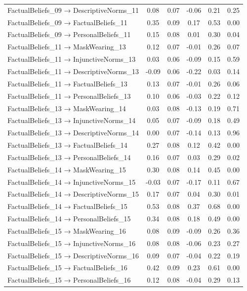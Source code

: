 \documentclass[
  man, donotrepeattitle,floatsintext]{apa6}
\begin{document}
\begin{center}
\begin{ThreePartTable}
{\begin{longtable}{lccccc}
FactualBeliefs\_09 → DescriptiveNorms\_11 & 0.08 & 0.07 & -0.06 & 0.21 & 0.25\\
FactualBeliefs\_09 → FactualBeliefs\_11 & 0.35 & 0.09 & 0.17 & 0.53 & 0.00\\
FactualBeliefs\_09 → PersonalBeliefs\_11 & 0.15 & 0.08 & 0.01 & 0.30 & 0.04\\
FactualBeliefs\_11 → MaskWearing\_13 & 0.12 & 0.07 & -0.01 & 0.26 & 0.07\\
FactualBeliefs\_11 → InjunctiveNorms\_13 & 0.03 & 0.06 & -0.09 & 0.15 & 0.59\\
FactualBeliefs\_11 → DescriptiveNorms\_13 & -0.09 & 0.06 & -0.22 & 0.03 & 0.14\\
FactualBeliefs\_11 → FactualBeliefs\_13 & 0.13 & 0.07 & -0.01 & 0.26 & 0.06\\
FactualBeliefs\_11 → PersonalBeliefs\_13 & 0.10 & 0.06 & -0.03 & 0.22 & 0.12\\
FactualBeliefs\_13 → MaskWearing\_14 & 0.03 & 0.08 & -0.13 & 0.19 & 0.71\\
FactualBeliefs\_13 → InjunctiveNorms\_14 & 0.05 & 0.07 & -0.09 & 0.18 & 0.49\\
FactualBeliefs\_13 → DescriptiveNorms\_14 & 0.00 & 0.07 & -0.14 & 0.13 & 0.96\\
FactualBeliefs\_13 → FactualBeliefs\_14 & 0.27 & 0.08 & 0.12 & 0.42 & 0.00\\
FactualBeliefs\_13 → PersonalBeliefs\_14 & 0.16 & 0.07 & 0.03 & 0.29 & 0.02\\
FactualBeliefs\_14 → MaskWearing\_15 & 0.30 & 0.08 & 0.14 & 0.45 & 0.00\\
FactualBeliefs\_14 → InjunctiveNorms\_15 & -0.03 & 0.07 & -0.17 & 0.11 & 0.67\\
FactualBeliefs\_14 → DescriptiveNorms\_15 & 0.17 & 0.07 & 0.04 & 0.30 & 0.01\\
FactualBeliefs\_14 → FactualBeliefs\_15 & 0.53 & 0.08 & 0.37 & 0.68 & 0.00\\
FactualBeliefs\_14 → PersonalBeliefs\_15 & 0.34 & 0.08 & 0.18 & 0.49 & 0.00\\
FactualBeliefs\_15 → MaskWearing\_16 & 0.08 & 0.09 & -0.09 & 0.26 & 0.36\\
FactualBeliefs\_15 → InjunctiveNorms\_16 & 0.08 & 0.08 & -0.06 & 0.23 & 0.27\\
FactualBeliefs\_15 → DescriptiveNorms\_16 & 0.09 & 0.07 & -0.04 & 0.22 & 0.19\\
FactualBeliefs\_15 → FactualBeliefs\_16 & 0.42 & 0.09 & 0.23 & 0.61 & 0.00\\
FactualBeliefs\_15 → PersonalBeliefs\_16 & 0.12 & 0.08 & -0.04 & 0.29 & 0.13\\

\end{longtable}}
\end{ThreePartTable}
\end{center}
\end{document}
